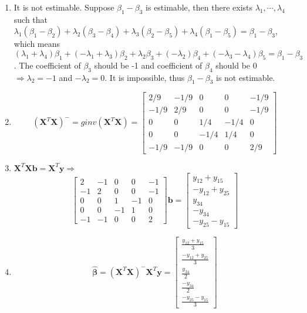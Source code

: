 \documentclass{article}
\begin{document}
\begin{enumerate}[leftmargin = 0 em, label = \arabic*., font = \bfseries]
\begin{enumerate}
	\item 
	It is not estimable. Suppose $\beta_1 - \beta_3$ is estimable, then there exists $\lambda_1, \cdots, \lambda_4$ such that $\lambda_1 (\beta_1 - \beta_2) + \lambda_2 (\beta_3 - \beta_4) + \lambda_3 (\beta_2 - \beta_5) + \lambda_4 (\beta_1 - \beta_5) = \beta_1 - \beta_3$, which means $(\lambda_1 + \lambda_4) \beta_1 + (-\lambda_1 + \lambda_3) \beta_2 + \lambda_2 \beta_3 + (-\lambda_2)\beta_4 + (-\lambda_3 - \lambda_4)\beta_5 = \beta_1 - \beta_3$. The coefficient of $\beta_3$ should be -1 and coefficient of $\beta_4$ should be 0 $\Rightarrow \lambda_2 = -1$ and $-\lambda_2 = 0$. It is impossible, thus $\beta_1 - \beta_3$ is not estimable.


		\item 
		\[(\bm X^T \bm X)^- = ginv(\bm X^T \bm X) = \begin{bmatrix}
			2/9 & -1/9 & 0 & 0& -1/9\\
			-1/9 & 2/9 & 0 & 0& -1/9\\
			0 & 0 & 1/4 & -1/4 & 0\\
			0 & 0 & -1/4 & 1/4 & 0\\
			-1/9 & -1/9 & 0 & 0 & 2/9
		\end{bmatrix}\]


		\item 
		$\bm X^T \bm X \bm b = \bm X^T \bm y \Rightarrow$
		\[\begin{bmatrix}
			 2  & -1  &  0  &  0 &  -1\\
 			-1   & 2  &  0   & 0  & -1\\
			0   & 0    &1   &-1    &0\\
   			0   & 0   &-1    &1    &0\\
 			 -1  & -1  &  0  &  0   & 2
		\end{bmatrix} \bm b = \begin{bmatrix}
			y_{12} + y_{15}\\
			-y_{12} + y_{25}\\
			y_{34}\\
			-y_{34}\\
			-y_{25} - y_{15}
		\end{bmatrix}\]

		\item 
		\[\hat{\bm \beta} = (\bm X^T \bm X)^- \bm X^T \bm y = \begin{bmatrix}
			\frac{y_{12} + y_{15}}{3}\\
			\frac{-y_{12}+ y_{25}}{3}\\
			\frac{y_{34}}{2}\\
			\frac{-y_{34}}{2}\\
			\frac{-y_{25} - y_15}{3}
		\end{bmatrix}\]



\end{enumerate}
\end{enumerate}
\end{document}

